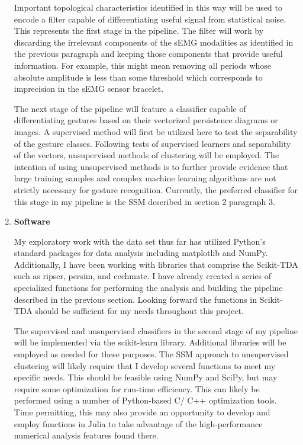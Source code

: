 \documentclass[11pt]{article}
\begin{document}
\begin{enumerate}
Important topological characteristics identified in this way will be used to encode a filter capable of differentiating useful signal from statistical noise. This represents the first stage in the pipeline. The filter will work by discarding the irrelevant components of the sEMG modalities as identified in the previous paragraph and keeping those components that provide useful information. For example, this might mean removing all periods whose absolute amplitude is less than some threshold which corresponds to imprecision in the sEMG sensor bracelet.

The next stage of the pipeline will feature a classifier capable of differentiating gestures based on their vectorized persistence diagrams or images. A supervised method will first be utilized here to test the separability of the gesture classes. Following tests of supervised learners and separability of the vectors, unsupervised methods of clustering will be employed. The intention of using unsupervised methods is to further provide evidence that large training samples and complex machine learning algorithms are not strictly necessary for gesture recognition. Currently, the preferred classifier for this stage in my pipeline is the SSM described in section 2 paragraph 3.



\newpage

\item \textbf{Software}

My exploratory work with the data set thus far has utilized Python's standard packages for data analysis including matplotlib and NumPy. Additionally, I have been working with libraries that comprise the Scikit-TDA such as ripser, persim, and cechmate. I have already created a series of specialized functions for performing the analysis and building the pipeline described in the previous section. Looking forward the functions in Scikit-TDA should be sufficient for my needs throughout this project.

The supervised and unsupervised classifiers in the second stage of my pipeline will be implemented via the scikit-learn library. Additional libraries will be employed as needed for these purposes. The SSM approach \cite{ssm1}\cite{snf} to unsupervised clustering will likely require that I develop several functions to meet my specific needs. This should be feasible using NumPy and SciPy, but may require some optimization for run-time efficiency. This can likely be performed using a number of Python-based C/ C++ optimization tools. Time permitting, this may also provide an opportunity to develop and employ functions in Julia to take advantage of the high-performance numerical analysis features found there.


\end{enumerate}
\end{document}
